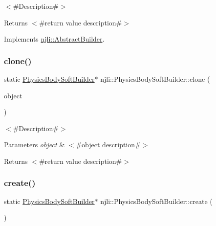$<$\#\+Description\#$>$

\begin{DoxyReturn}{Returns}
$<$\#return value description\#$>$ 
\end{DoxyReturn}


Implements \mbox{\hyperlink{classnjli_1_1_abstract_builder_aa1d220053e182c37b31b427499c6eacf}{njli\+::\+Abstract\+Builder}}.

\mbox{\label{classnjli_1_1_physics_body_soft_builder_a8aa659a234c78f56e03ef5bae4d4903a}} 
\subsubsection{\texorpdfstring{clone()}{clone()}}
{\footnotesize\ttfamily static \mbox{\hyperlink{classnjli_1_1_physics_body_soft_builder}{Physics\+Body\+Soft\+Builder}}$\ast$ njli\+::\+Physics\+Body\+Soft\+Builder\+::clone (\begin{DoxyParamCaption}\item[{const \mbox{\hyperlink{classnjli_1_1_physics_body_soft_builder}{Physics\+Body\+Soft\+Builder}} \&}]{object }\end{DoxyParamCaption})\hspace{0.3cm}{\ttfamily [static]}}

$<$\#\+Description\#$>$


\begin{DoxyParams}{Parameters}
{\em object} & $<$\#object description\#$>$\\
\hline
\end{DoxyParams}
\begin{DoxyReturn}{Returns}
$<$\#return value description\#$>$ 
\end{DoxyReturn}
\mbox{\label{classnjli_1_1_physics_body_soft_builder_ab70e1bf497a340d25921592ee9191cad}} 
\subsubsection{\texorpdfstring{create()}{create()}}
{\footnotesize\ttfamily static \mbox{\hyperlink{classnjli_1_1_physics_body_soft_builder}{Physics\+Body\+Soft\+Builder}}$\ast$ njli\+::\+Physics\+Body\+Soft\+Builder\+::create (\begin{DoxyParamCaption}{ }\end{DoxyParamCaption})\hspace{0.3cm}{\ttfamily [static]}}

